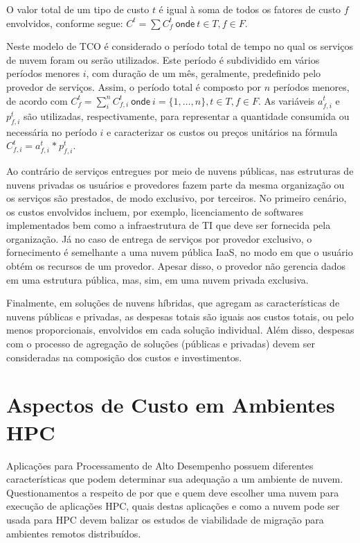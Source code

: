 \documentclass[tese,capa]{texufpel}
\begin{document}
O valor total de um tipo de custo $t$ é igual à soma de todos os fatores de custo $f$ envolvidos, conforme segue: $C^t = \sum C^t_f ~\textsf{onde}~ t \in T, f \in F$. 

Neste modelo de TCO é considerado o período total de tempo no qual os serviços de nuvem foram ou serão utilizados. Este período é subdividido em vários períodos menores $i$, com duração de um mês, geralmente, predefinido pelo provedor de serviços. Assim, o período total é composto por $n$ períodos menores, de acordo com $C^t_f = \sum^n_i C^t_{f,i} ~\textsf{onde}~ i = \{1, \dots, n\}, t \in T, f \in F$. As variáveis $a^t_{f,i}$ e $p^t_{f,i}$ são utilizadas, respectivamente, para representar a quantidade consumida ou necessária no período $i$ e caracterizar os custos ou preços unitários na fórmula $C^t_{f,i} = a^t_{f,i} ~\textsf{*}~ p^t_{f,i}$.

Ao contrário de serviços entregues por meio de nuvens públicas, nas estruturas de nuvens privadas os usuários e provedores fazem parte da mesma organização ou os serviços são prestados, de modo exclusivo, por terceiros. No primeiro cenário, os custos envolvidos incluem, por exemplo, licenciamento de softwares implementados bem como a infraestrutura de TI que deve ser fornecida pela organização. Já no caso de entrega de serviços por provedor exclusivo, o fornecimento é semelhante a uma nuvem pública IaaS, no modo em que o usuário obtém os recursos de um provedor. Apesar disso, o provedor não gerencia dados em uma estrutura pública, mas, sim, em uma nuvem privada exclusiva. 

Finalmente, em soluções de nuvens híbridas, que agregam as características de nuvens públicas e privadas, as despesas totais são iguais aos custos totais, ou pelo menos proporcionais, envolvidos em cada solução individual. Além disso, despesas com o processo de agregação de soluções (públicas e privadas) devem ser consideradas na composição dos custos e investimentos.

\section{Aspectos de Custo em Ambientes HPC}\label{sec:custoshpc}

Aplicações para Processamento de Alto Desempenho possuem diferentes características que podem determinar sua adequação a um ambiente de nuvem. Questionamentos a respeito de por que e quem deve escolher uma nuvem para execução de aplicações HPC, quais destas aplicações e como a nuvem pode ser usada para HPC devem balizar os estudos de viabilidade de migração para ambientes remotos distribuídos. 
\end{document}
